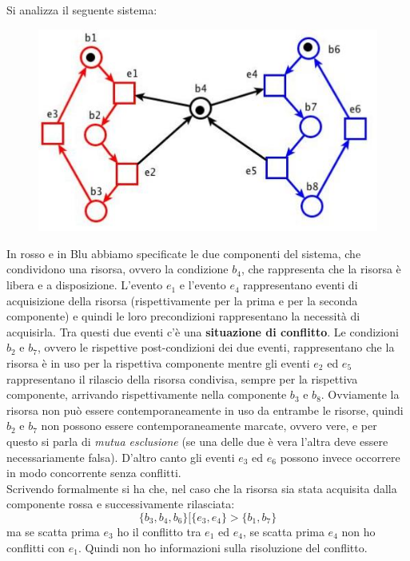 \begin{esempio}
  Si analizza il seguente sistema:
  \begin{figure}[H]
    \centering
    \includegraphics[scale = 0.4]{img/mes.jpg} 
  \end{figure}
  In rosso e in Blu abbiamo specificate le due componenti del sistema, che
  condividono una risorsa, ovvero la condizione $b_4$, che rappresenta che la
  risorsa è libera e a disposizione. L'evento $e_1$ e l'evento $e_4$ rappresentano
  eventi di acquisizione della risorsa (rispettivamente per la prima e per la
  seconda componente) e quindi le loro precondizioni rappresentano la necessità
  di acquisirla. Tra questi due eventi c'è una \textbf{situazione di
    conflitto}. Le condizioni $b_2$ e $b_7$, ovvero le rispettive post-condizioni
  dei due eventi, rappresentano che la risorsa è in uso per la rispettiva
  componente mentre gli eventi $e_2$ ed $e_5$ rappresentano il rilascio della
  risorsa condivisa, sempre per la rispettiva componente, arrivando
  rispettivamente nella componente $b_3$ e $b_8$. Ovviamente la risorsa
  non può essere contemporaneamente in uso da entrambe le risorse, quindi $b_2$
  e $b_7$ non possono essere contemporaneamente marcate, ovvero vere, e per
  questo si parla di \textit{mutua esclusione} (se una delle due è vera l'altra
  deve essere necessariamente falsa). D'altro canto gli
  eventi $e_3$ ed $e_6$ possono invece occorrere in modo concorrente senza
  conflitti.\\
  Scrivendo formalmente si ha che, nel caso che la risorsa sia stata acquisita
  dalla componente rossa e successivamente rilasciata:
  \[\{b_3, b_4, b_6\}[\{e_3, e_4\}>\{b_1, b_7\}\]
  ma se scatta prima $e_3$ ho il conflitto tra $e_1$ ed $e_4$, se scatta prima
  $e_4$ non ho conflitti con $e_1$. Quindi non ho informazioni sulla risoluzione
  del conflitto.\\
\end{esempio}

